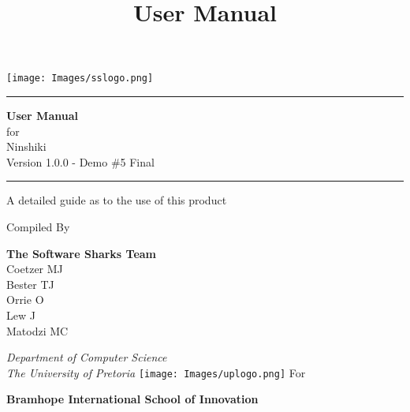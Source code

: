 \documentclass[a4paper, 12pt]{article}
\begin{document}
\title{User Manual}

\begin{titlepage}
\texttt{[image: Images/sslogo.png]}
	\centering
	
    \scshape
    \sffamily
	
	\vspace*{\baselineskip}
	
	\rule{\textwidth}{3pt}
	
	\vspace{0.75\baselineskip}
	
	\textrm{\LARGE \textbf{User Manual} \\ for\\ Ninshiki\\ 
    \small Version 1.0.0 - Demo \#5 Final\\}
	
	\vspace{0.75\baselineskip}
	
	\rule{\textwidth}{3pt} 
	
	\vspace{2\baselineskip}
	
	A detailed guide as to the use of this product 
	
	\vspace*{3\baselineskip}
	
	Compiled By
	
	\vspace{0.5\baselineskip}
	
    \textsf{\large
    \textrm{\textbf{The Software Sharks Team}} \\
    \small 
    Coetzer MJ \\
    Bester TJ \\
    Orrie O \\
    Lew J \\
    Matodzi MC \\
    } 
	
	\vspace{0.5\baselineskip}
	
	\textit{ Department of Computer Science \\ The University of Pretoria}
    \vfill
    \texttt{[image: Images/uplogo.png]}
    \vfill
    For
	\vspace{0.5\baselineskip}
	
    \textsf{\large
    \textrm{\textbf{Bramhope International School of Innovation}} \\
    } 

\end{titlepage}
\end{document}
